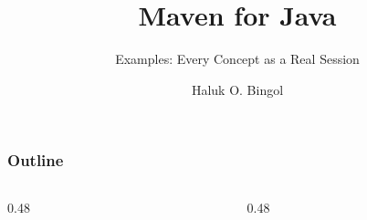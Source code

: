\documentclass[aspectratio=169,10pt,compress]{beamer}
\title{Maven for Java}
\subtitle{Examples: Every Concept as a Real Session}
\author[Bingol]{Haluk O. Bingol}
\institute[FCIS]{
    Faculty of Computer and Information Sciences\\
    Yeditepe University
}
\date{
	{\tiny \hbTimeStamp}
}
\begin{document}
\begin{frame}[t,fragile]
  \titlepage
\end{frame}




\begin{frame}[t,fragile] \frametitle{Outline}
  \begin{columns}[T]
    \begin{column}{0.48\textwidth}
      \tableofcontents[sections={1-4}, hideallsubsections]
    \end{column}
    \begin{column}{0.48\textwidth}
      \tableofcontents[sections={5-7}, hideallsubsections]
    \end{column}
  \end{columns}
\end{frame}
\end{document}
